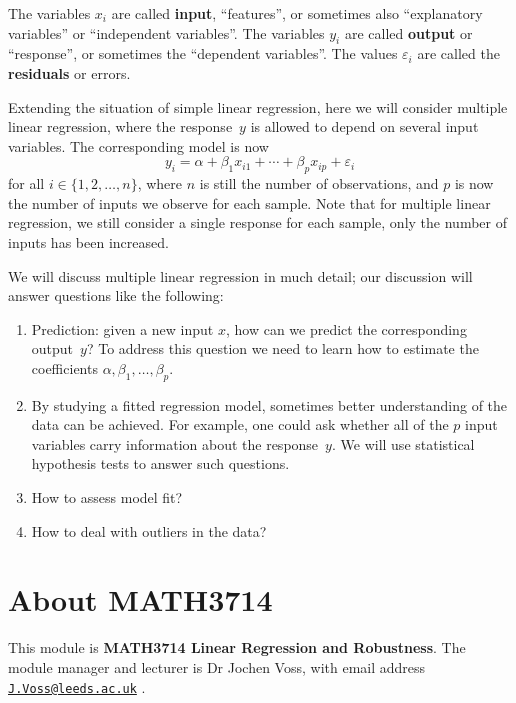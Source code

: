 \documentclass[
  a4paper,
]{article}
\providecommand{\tightlist}{%
  \setlength{\itemsep}{0pt}\setlength{\parskip}{0pt}}
\theoremstyle{definition}
\theoremstyle{definition}
\theoremstyle{definition}
\theoremstyle{definition}
\theoremstyle{remark}
\begin{document}
The variables \(x_i\) are called \textbf{input}, ``features'', or
sometimes also ``explanatory variables'' or ``independent variables''.
The variables \(y_i\) are called \textbf{output} or ``response'', or sometimes the
``dependent variables''. The values \(\varepsilon_i\) are called the \textbf{residuals} or errors.

Extending the situation of simple linear regression, here
we will consider multiple linear regression, where the response~\(y\)
is allowed to depend on several input variables. The corresponding
model is now
\begin{equation*}
  y_i = \alpha + \beta_1 x_{i1} + \cdots + \beta_p x_{ip} + \varepsilon_i
\end{equation*}
for all \(i \in \{1, 2, \ldots, n\}\), where \(n\) is still the number
of observations, and \(p\) is now the number of inputs we observe for
each sample.
Note that for multiple linear regression, we still consider a
single response for each sample, only the number of inputs has been
increased.

We will discuss multiple linear regression in much detail; our discussion
will answer questions like the following:

\begin{enumerate}
\def\labelenumi{\arabic{enumi}.}
\tightlist
\item
  Prediction: given a new input \(x\), how can we predict
  the corresponding output~\(y\)? To address this question
  we need to learn how to estimate the coefficients \(\alpha, \beta_1, \ldots, \beta_p\).
\item
  By studying a fitted regression model, sometimes better understanding
  of the data can be achieved. For example, one could ask whether
  all of the \(p\) input variables carry information about the response~\(y\).
  We will use statistical hypothesis tests to answer such questions.
\item
  How to assess model fit?
\item
  How to deal with outliers in the data?
\end{enumerate}

\clearpage

\hypertarget{S00-about}{%
\section*{About MATH3714}\label{S00-about}}

This module is \textbf{MATH3714 Linear Regression and Robustness}. The
module manager and lecturer is Dr Jochen Voss,
with email address \href{mailto:J.Voss@leeds.ac.uk}{\nolinkurl{J.Voss@leeds.ac.uk}} .
\end{document}
